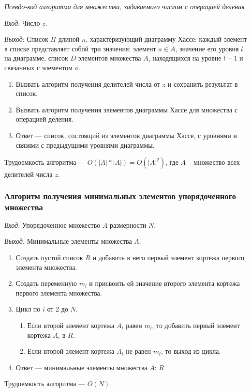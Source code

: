 \documentclass[bachelor, och, labwork]{shiza}
\begin{document}
\begin{center}\textit{Псевдо-код алгоритма для множества, задаваемого числом с операцией деления}\end{center}

\textit{Вход}: Число $z$.

\textit{Выход}: Список $H$ длиной $n$, характеризующий диаграмму Хассе: каждый 
элемент в списке представляет собой три значения: элемент $a \in A$, значение его 
уровня $l$ на диаграмме, список $D$ элементов множества $A$, находящихся на 
уровне $l - 1$ и связанных с элементом $a$.

\begin{enumerate}
    \item Вызвать алгоритм получения делителей числа от $z$ и сохранить результат в список.
    \item Вызвать алгоритм получения элементов диаграммы Хассе для множества с операцией деления.
    \item Ответ --- список, состоящий из элементов диаграммы Хассе, с уровнями 
    и связями с предыдущими уровнями диаграммы.
\end{enumerate}
Трудоемкость алгоритма --- $O(|A| * |A|) = O(|A|^2)$, где $A$ -- множество всех
делителей числа $z$.

\subsubsection{Алгоритм получения минимальных элементов упорядоченного множества}

\textit{Вход}: Упорядоченное множество $A$ размерности $N$.

\textit{Выход.} Минимальные элементы множества $A$.
\begin{enumerate}
    \item Создать пустой список $R$ и добавить в него первый элемент кортежа
    первого элемента множества.
    \item Создать переменную $m_l$ и присвоить ей значение второго элемента кортежа
    первого элемента множества.
    \item Цикл по $i$ от 2 до $N$.
        \begin{enumerate}
            \item Если второй элемент кортежа $A_i$ равен $m_l$, то добавить
            первый элемент кортежа $A_i$ в $R$.
            \item Если второй элемент кортежа $A_i$ не равен $m_l$, то выход из цикла.
        \end{enumerate}
    \item Ответ --- минимальные элементы множества $A$: $R$
\end{enumerate}
Трудоемкость алгоритма --- $O(N)$.
\end{document}
